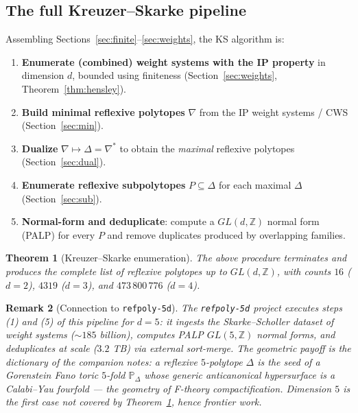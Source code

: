 \documentclass{amsart}
\newtheorem{theorem}{Theorem}[section]
\newtheorem{remark}[theorem]{Remark}
\begin{document}
\subsection{The full Kreuzer--Skarke pipeline}

Assembling Sections~\ref{sec:finite}--\ref{sec:weights}, the KS algorithm is:

\begin{enumerate}
  \item \textbf{Enumerate (combined) weight systems with the IP property}
        in dimension $d$, bounded using finiteness
        (Section~\ref{sec:weights}, Theorem~\ref{thm:hensley}).
  \item \textbf{Build minimal reflexive polytopes} $\nabla$ from the IP
        weight systems / CWS (Section~\ref{sec:min}).
  \item \textbf{Dualize} $\nabla \mapsto \Delta=\nabla^*$ to obtain the
        \emph{maximal} reflexive polytopes (Section~\ref{sec:dual}).
  \item \textbf{Enumerate reflexive subpolytopes} $P \subseteq \Delta$ for
        each maximal $\Delta$ (Section~\ref{sec:sub}).
  \item \textbf{Normal-form and deduplicate}: compute a $GL(d,\mathbb{Z})$
        normal form (PALP) for every $P$ and remove duplicates produced by
        overlapping families.
\end{enumerate}

\begin{theorem}[Kreuzer--Skarke enumeration]\label{thm:ks}
The above procedure terminates and produces the complete list of reflexive
polytopes up to $GL(d,\mathbb{Z})$, with counts
$16$ ($d=2$), $4319$ ($d=3$), and $473\,800\,776$ ($d=4$).
\end{theorem}

\begin{remark}[Connection to \texttt{refpoly-5d}]
The \texttt{refpoly-5d} project executes steps (1) and (5) of this pipeline
for $d=5$: it ingests the Skarke--Scholler dataset of weight systems
($\sim$$185$ billion), computes PALP $GL(5,\mathbb{Z})$ normal forms, and
deduplicates at scale ($3.2$ TB) via external sort-merge. The geometric
payoff is the dictionary of the companion notes: a reflexive $5$-polytope
$\Delta$ is the seed of a Gorenstein Fano toric $5$-fold $\mathbb{P}_\Delta$
whose generic anticanonical hypersurface is a Calabi--Yau \emph{fourfold} ---
the geometry of F-theory compactification. Dimension $5$ is the first case
not covered by Theorem~\ref{thm:ks}, hence frontier work.
\end{remark}
\end{document}
